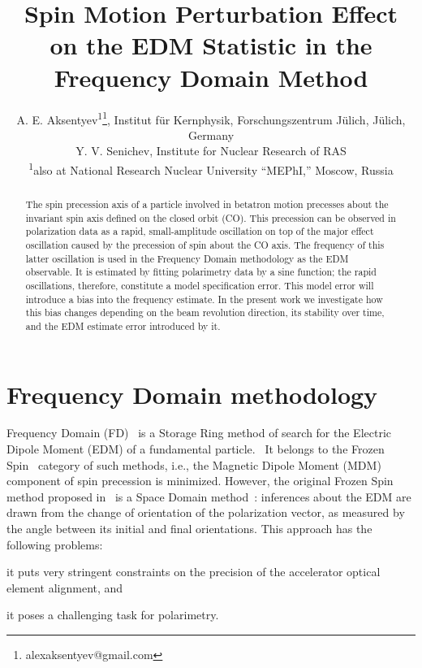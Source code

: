 \documentclass[a4paper]{jacow}
\begin{document}
\title{Spin Motion Perturbation Effect on the EDM Statistic in the Frequency Domain Method}
\author{A. E. Aksentyev\textsuperscript{1}\thanks{alexaksentyev@gmail.com},
  Institut f\"ur Kernphysik, Forschungszentrum J\"ulich, J\"ulich, Germany \\
  Y. V. Senichev, Institute for Nuclear Research of RAS \\
  \textsuperscript{1}also at National Research Nuclear University ``MEPhI,'' Moscow, Russia}
\maketitle
{}
\begin{abstract}
  The spin precession axis of a particle involved in betatron motion precesses about the invariant spin axis
  defined on the closed orbit (CO). This precession can be observed in polarization data as a rapid,
  small-amplitude oscillation on top of the major effect oscillation caused by the precession of spin
  about the CO axis. The frequency of this latter oscillation is used in the Frequency Domain methodology
  as the EDM observable. It is estimated by fitting polarimetry data by a sine function; the rapid
  oscillations, therefore, constitute a model specification error.
  This model error will introduce a bias into the frequency estimate. In the present work we investigate
  how this bias changes depending on the beam revolution direction, its stability over time, and
  the EDM estimate error introduced by it.
\end{abstract}

\section{Frequency Domain methodology}
Frequency Domain (FD)~\cite{Senichev:FDM} is a Storage Ring method of search for the
Electric Dipole Moment (EDM) of a fundamental particle.~\cite{BNL:SREDM}
It belongs to the Frozen Spin~\cite{BNL:Deuteron2008} category
of such methods, i.e., the Magnetic Dipole Moment (MDM) component of spin precession is minimized. However,
the original Frozen Spin method proposed in~\cite{BNL:Deuteron2008} is a Space Domain
method~\cite[p.~4]{Talman:ElectricRings}: inferences about the EDM are drawn from the change of orientation
of the polarization vector, as measured by the angle between its initial and final orientations. This approach
has the following problems:
\begin{inparaenum}
\item it puts very stringent constraints on the precision of the accelerator optical element alignment, and
\item it poses a challenging task for polarimetry.~\cite[p.~6]{Mane:SpinWheel}
\end{inparaenum}
\end{document}
